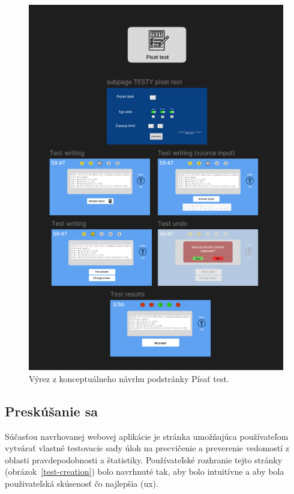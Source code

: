 \begin{figure}[H]
  \centering
  \includegraphics[width=16cm]{img/figma_screen.png}
  \caption{Výrez z konceptuálneho návrhu podstránky Písať test.}
  \label{figmavizual}
\end{figure} 

\subsection{Preskúšanie sa}

Súčasťou navrhovanej webovej aplikácie je stránka umožňujúca používateľom vytvárať vlastné testovacie sady úloh na precvičenie a preverenie vedomostí z oblasti pravdepodobnosti a štatistiky.
 Používateľské rozhranie tejto stránky (obrázok~\ref{test-creation}) bolo navrhnuté tak, aby bolo intuitívne a aby bola použivateľská skúsenosť čo najlepšia (\acrshort{ux}).

